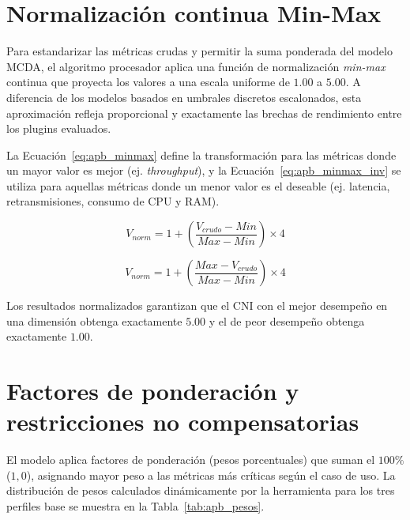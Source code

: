 \iffalse
\section{Normalización continua Min-Max} \label{sec:apb_umbrales}

Para estandarizar las métricas crudas y permitir la suma ponderada del modelo MCDA, el algoritmo procesador aplica una función de normalización \emph{min-max} continua que proyecta los valores a una escala uniforme de $1.00$ a $5.00$. A diferencia de los modelos basados en umbrales discretos escalonados, esta aproximación refleja proporcional y exactamente las brechas de rendimiento entre los plugins evaluados.

La Ecuación~\ref{eq:apb_minmax} define la transformación para las métricas donde un mayor valor es mejor (ej. \emph{throughput}), y la Ecuación~\ref{eq:apb_minmax_inv} se utiliza para aquellas métricas donde un menor valor es el deseable (ej. latencia, retransmisiones, consumo de CPU y RAM).

\begin{equation}
  V_{norm} = 1 + \left( \frac{V_{crudo} - Min}{Max - Min} \right) \times 4
  \label{eq:apb_minmax}
\end{equation}

\begin{equation}
  V_{norm} = 1 + \left( \frac{Max - V_{crudo}}{Max - Min} \right) \times 4
  \label{eq:apb_minmax_inv}
\end{equation}

Los resultados normalizados garantizan que el CNI con el mejor desempeño en una dimensión obtenga exactamente $5.00$ y el de peor desempeño obtenga exactamente $1.00$.

\section{Factores de ponderación y restricciones no compensatorias} \label{sec:apb_ponderaciones}

El modelo aplica factores de ponderación (pesos porcentuales) que suman el $100\%$ ($1,0$), asignando mayor peso a las métricas más críticas según el caso de uso. La distribución de pesos calculados dinámicamente por la herramienta para los tres perfiles base se muestra en la Tabla~\ref{tab:apb_pesos}.

